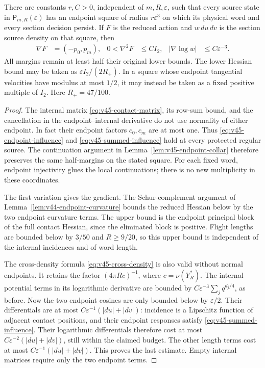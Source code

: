 \begin{lemma}
\label{lem:v46-regular-endpoints}
There are constants $r,C>0$, independent of $m,R,\varepsilon$, such
that every source state in $\mathsf P_{m,R}(\varepsilon)$ has an endpoint
square of radius $r\varepsilon^3$ on which its physical word and every
section decision persist. If $F$ is the reduced action and $w\,du\,dv$
is the section source density on that square, then
\begin{align}
 \nabla F&=(-p_0,p_m),&
 0<\nabla^2F&\le C I_2,&
 |\nabla\log w|&\le C\varepsilon^{-3}.
                                      \label{eq:v46-regular-chart}
\end{align}
All margins remain at least half their original lower bounds. The
lower Hessian bound may be taken as $\varepsilon I_2/(2R_+)$. In a
square whose endpoint tangential velocities have modulus at most
$1/2$, it may instead be taken as a fixed positive multiple of $I_2$.
Here $R_+=47/100$.
\end{lemma}
\begin{proof}
The internal matrix \eqref{eq:v45-contact-matrix}, its row-sum bound,
and the cancellation in the endpoint--internal derivative do not use
normality of either endpoint. In fact their endpoint factors $c_0,c_m$
are at most one. Thus \eqref{eq:v45-endpoint-influence} and
\eqref{eq:v45-summed-influence} hold at every protected regular source.
The continuation argument in Lemma~\ref{lem:v45-endpoint-collar}
therefore preserves the same half-margins on the stated square. For
each fixed word, endpoint injectivity glues the local continuations;
there is no new multiplicity in these coordinates.

The first variation gives the gradient. The Schur-complement argument
of Lemma~\ref{lem:v44-endpoint-curvature} bounds the reduced Hessian
below by the two endpoint curvature terms. The upper bound is the
endpoint principal block of the full contact Hessian, since the
eliminated block is positive. Flight lengths are bounded below by
$3/50$ and $R\ge9/20$, so this upper bound is independent of the
internal incidences and of word length.

The cross-density formula \eqref{eq:v45-cross-density} is also valid
without normal endpoints. It retains the factor $(4\pi R c)^{-1}$,
where $c=\nu(Y_R^*)$. The internal potential terms in its logarithmic
derivative are bounded by
$C\varepsilon^{-3}\sum_j q^{d_j/4}$, as before. Now the two endpoint
cosines are only bounded below by $\varepsilon/2$. Their differentials
are at most $C\varepsilon^{-1}(|du|+|dv|)$: incidence is a Lipschitz
function of adjacent contact positions, and their endpoint responses
satisfy \eqref{eq:v45-summed-influence}. Their logarithmic differentials
therefore cost at most $C\varepsilon^{-2}(|du|+|dv|)$, still within the
claimed budget. The other length terms cost at most
$C\varepsilon^{-1}(|du|+|dv|)$. This proves the last estimate.
Empty internal matrices require only the two endpoint terms.
\end{proof}

